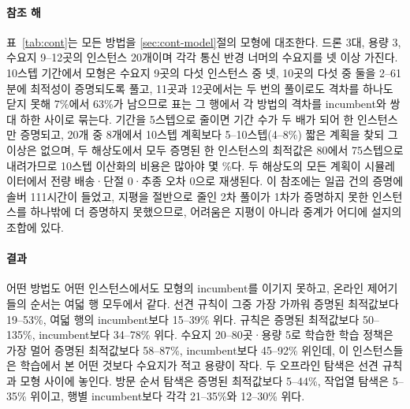 \documentclass[final,5p,times,twocolumn]{elsarticle}
\begin{document}
\paragraph{참조 해}
표~\ref{tab:cont}는 모든 방법을 \ref{sec:cont-model}절의 모형에 대조한다. 드론 3대, 용량 3, 수요지
9--12곳의 인스턴스 20개이며 각각 통신 반경 너머의 수요지를 넷 이상 가진다. 10스텝 기간에서 모형은
수요지 9곳의 다섯 인스턴스 중 넷, 10곳의 다섯 중 둘을 2--61분에 최적성이 증명되도록 풀고, 11곳과
12곳에서는 두 번의 풀이로도 격차를 하나도 닫지 못해 7\%에서 63\%가 남으므로 표는 그 행에서 각 방법의
격차를 incumbent와 쌍대 하한 사이로 묶는다. 기간을 5스텝으로 줄이면 기간 수가 두 배가 되어 한
인스턴스만 증명되고, 20개 중 8개에서 10스텝 계획보다 5--10스텝(4--8\%) 짧은 계획을 찾되 그 이상은
없으며, 두 해상도에서 모두 증명된 한 인스턴스의 최적값은 80에서 75스텝으로 내려가므로 10스텝
이산화의 비용은 많아야 몇 \%다. 두 해상도의 모든 계획이 시뮬레이터에서 전량 배송·단절 0·추종 오차
0으로 재생된다. 이 참조에는 일곱 건의 증명에 솔버 111시간이 들었고, 지평을 절반으로 줄인 2차 풀이가
1차가 증명하지 못한 인스턴스를 하나밖에 더 증명하지 못했으므로, 어려움은 지평이 아니라 중계가 어디에
설지의 조합에 있다.

\paragraph{결과}
어떤 방법도 어떤 인스턴스에서도 모형의 incumbent를 이기지 못하고, 온라인 제어기들의 순서는 여덟 행
모두에서 같다. 선견 규칙이 그중 가장 가까워 증명된 최적값보다 19--53\%, 여덟 행의 incumbent보다
15--39\% 위다. 규칙은 증명된 최적값보다 50--135\%, incumbent보다 34--78\% 위다. 수요지 20--80곳·용량
5로 학습한 학습 정책은 가장 멀어 증명된 최적값보다 58--87\%, incumbent보다 45--92\% 위인데, 이
인스턴스들은 학습에서 본 어떤 것보다 수요지가 적고 용량이 작다. 두 오프라인 탐색은 선견 규칙과 모형
사이에 놓인다. 방문 순서 탐색은 증명된 최적값보다 5--44\%, 작업열 탐색은 5--35\% 위이고, 행별
incumbent보다 각각 21--35\%와 12--30\% 위다.
\end{document}

